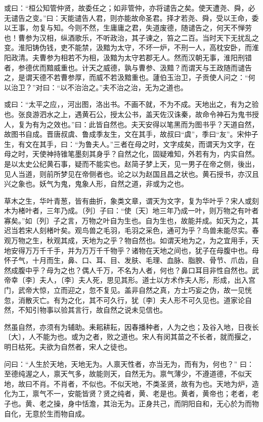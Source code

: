 \documentclass[]{article}
\begin{document}
或曰：``桓公知管仲贤，故委任之；如非管仲，亦将谴告之矣。使天遭尧、舜，必无谴告之变。''曰：天能谴告人君，则亦能故命圣君。择才若尧、舜，受以王命，委以王事，勿复与知。今则不然，生庸庸之君，失道废德，随谴告之，何天不惮劳也！曹参为汉相，纵酒歌乐，不听政治，其子谏之，笞之二百。当时天下无扰乱之变。淮阳铸伪钱，吏不能禁，汲黯为太守，不坏一炉，不刑一人，高枕安卧，而淮阳政清。夫曹参为相若不为相，汲黯为太守若郡无人。然而汉朝无事，淮阳刑错者，参德优而黯威重也。计天之威德，孰与曹参、汲黯？而谓天与王政随而谴告之，是谓天德不若曹参厚，而威不若汲黯重也。蘧伯玉治卫，子贡使人问之：``何以治卫？''对曰：``以不治治之。''夫不治之治，无为之道也。

或曰：``太平之应，，河出图，洛出书。不画不就，不为不成。天地出之，有为之验也。张良游泗水之上，遇黄石公，授太公书，盖天佐汉诛秦，故命令神石为鬼书授人，复为有为之效也。''曰：此皆自然也。夫天安得以笔黑而为图书乎？天道自然，故图书自成。晋唐叔虞、鲁成季友生，文在其手，故叔曰``虞''，季曰``友''。宋仲子生，有文在其手，曰：``为鲁夫人。''三者在母之时，文字成矣，而谓天为文字，在母之时，天使神持锥笔墨刻其身乎？自然之化，固疑难知，外若有为，内实自然。是以太史公纪黄石事，疑而不能实也。赵简子梦上天，见一男子在帝之侧，後出，见人当道，则前所梦见在帝侧者也。论之以为赵国且昌之状也。黄石授书，亦汉且兴之象也。妖气为鬼，鬼象人形，自然之道，非或为之也。

草木之生，华叶青葱，皆有曲折，象类文章，谓天为文字，复为华叶乎？宋人或刻木为楮叶者，三年乃成。〔列〕子曰：``使〔天〕地三年乃成一叶，则万物之有叶者寡矣。''如〔列〕子之言，万物之叶自为生也。自为生也，故能并成。如天为之，其迟当若宋人刻楮叶矣。观鸟兽之毛羽，毛羽之采色，通可为乎？鸟兽未能尽实。春观万物之生，秋观其成，天地为之乎？物自然也。如谓天地为之，为之宜用手，天地安得万万千千手，并为万万千千物乎？诸物在天地之间也，犹子在母腹中也。母怀子气，十月而生，鼻、口、耳、目、发肤、毛理、血脉、脂腴、骨节、爪齿，自然成腹中乎？母为之也？偶人千万，不名为人者，何也？鼻口耳目非性自然也。武帝幸〔李〕夫人，〔李〕夫人死，思见其形。道士以方术作夫人形，形成，出入宫门，武帝大惊，立而迎之，忽不复见。盖非自然之真，方士巧妄之伪，故一见恍忽，消散灭亡。有为之化，其不可久行，犹〔李〕夫人形不可久见也。道家论自然，不知引物事以验其言行，故自然之说未见信也。

然虽自然，亦须有为辅助。耒耜耕耘，因春播种者，人为之也；及谷入地，日夜长〔大〕，人不能为也。或为之者，败之道也。宋人有闵其苗之不长者，就而揠之，明日枯死。夫欲为自然者，宋人之徒也。

问曰：``人生於天地，天地无为。人禀天性者，亦当无为，而有为，何也？''
曰：至德纯渥之人，禀天气多，故能则天，自然无为。禀气薄少，不遵道德，不似天地，故曰不肖。不肖者，不似也。不似天地，不类圣贤，故有为也。天地为炉，造化为工，禀气不一，安能皆贤？贤之纯者，黄、老是也。黄者，黄帝也；老者，老子也。黄、老之操，身中恬澹，其治无为。正身共己，而阴阳自和，无心於为而物自化，无意於生而物自成。
\end{document}
